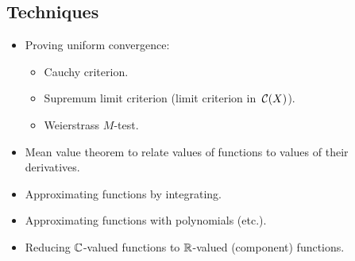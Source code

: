 \subsection*{Techniques}
\begin{itemize}[itemsep=0pt]
\item Proving uniform convergence:
\begin{itemize}[itemsep=0pt]
\item Cauchy criterion.
\item Supremum limit criterion (limit criterion in~\(\mathcal{C}(X)\)).
\item Weierstrass \(M\)-test.
\end{itemize}
\item Mean value theorem to relate values of functions to values of their derivatives.
\item Approximating functions by integrating.
\item Approximating functions with polynomials (etc.).
\item Reducing \(\mathbb{C}\)-valued functions to \(\mathbb{R}\)-valued (component) functions.
\end{itemize}
